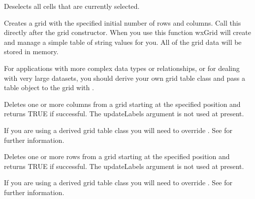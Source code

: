 \label{wxgridclearselection}


Deselects all cells that are currently selected.

\label{wxgridcreategrid}


Creates a grid with the specified initial number of rows and columns.
Call this directly after the grid constructor. When you use this
function wxGrid will create and manage a simple table of string values
for you. All of the grid data will be stored in memory.

For applications with more complex data types or relationships, or for
dealing with very large datasets, you should derive your own grid table
class and pass a table object to the grid with . 

\label{wxgriddeletecols}


Deletes one or more columns from a grid starting at the specified position and returns
TRUE if successful. The updateLabels argument is not used at present.

If you are using a derived grid table class you will need to override 
. See 
 for further information.

\label{wxgriddeleterows}


Deletes one or more rows from a grid starting at the specified position and returns
TRUE if successful. The updateLabels argument is not used at present.

If you are using a derived grid table class you will need to override 
. See 
 for further information.

\label{wxgriddisablecelleditcontrol}

